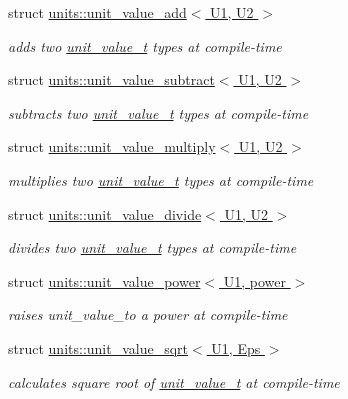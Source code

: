 \begin{DoxyCompactItemize}
\item 
struct \hyperlink{structunits_1_1unit__value__add}{units\+::unit\+\_\+value\+\_\+add$<$ U1, U2 $>$}
\begin{DoxyCompactList}\small\item\em adds two \hyperlink{structunits_1_1unit__value__t}{unit\+\_\+value\+\_\+t} types at compile-\/time \end{DoxyCompactList}\item 
struct \hyperlink{structunits_1_1unit__value__subtract}{units\+::unit\+\_\+value\+\_\+subtract$<$ U1, U2 $>$}
\begin{DoxyCompactList}\small\item\em subtracts two \hyperlink{structunits_1_1unit__value__t}{unit\+\_\+value\+\_\+t} types at compile-\/time \end{DoxyCompactList}\item 
struct \hyperlink{structunits_1_1unit__value__multiply}{units\+::unit\+\_\+value\+\_\+multiply$<$ U1, U2 $>$}
\begin{DoxyCompactList}\small\item\em multiplies two \hyperlink{structunits_1_1unit__value__t}{unit\+\_\+value\+\_\+t} types at compile-\/time \end{DoxyCompactList}\item 
struct \hyperlink{structunits_1_1unit__value__divide}{units\+::unit\+\_\+value\+\_\+divide$<$ U1, U2 $>$}
\begin{DoxyCompactList}\small\item\em divides two \hyperlink{structunits_1_1unit__value__t}{unit\+\_\+value\+\_\+t} types at compile-\/time \end{DoxyCompactList}\item 
struct \hyperlink{structunits_1_1unit__value__power}{units\+::unit\+\_\+value\+\_\+power$<$ U1, power $>$}
\begin{DoxyCompactList}\small\item\em raises unit\+\_\+value\+\_\+to a power at compile-\/time \end{DoxyCompactList}\item 
struct \hyperlink{structunits_1_1unit__value__sqrt}{units\+::unit\+\_\+value\+\_\+sqrt$<$ U1, Eps $>$}
\begin{DoxyCompactList}\small\item\em calculates square root of \hyperlink{structunits_1_1unit__value__t}{unit\+\_\+value\+\_\+t} at compile-\/time \end{DoxyCompactList}\end{DoxyCompactItemize}


